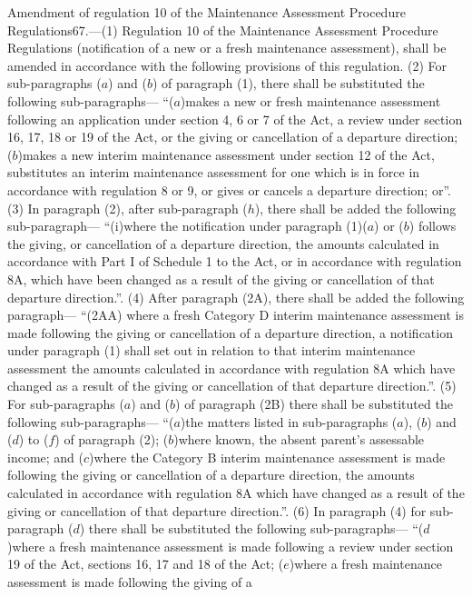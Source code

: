 \documentclass[a4paper]{article}
\begin{document}
Amendment of regulation 10 of the Maintenance Assessment Procedure
Regulations67.—(1) Regulation 10 of the Maintenance Assessment Procedure
Regulations (notification of a new or a fresh maintenance assessment), shall be
amended in accordance with the following provisions of this regulation.
(2) For sub-paragraphs ($a$) and ($b$) of paragraph (1), there shall be substituted
the following sub-paragraphs—
“($a$)makes a new or fresh maintenance assessment following an application under
section 4, 6 or 7 of the Act, a review under section 16, 17, 18 or 19 of the
Act, or the giving or cancellation of a departure direction;
($b$)makes a new interim maintenance assessment under section 12 of the Act,
substitutes an interim maintenance assessment for one which is in force in
accordance with regulation 8 or 9, or gives or cancels a departure direction;
or”.
(3) In paragraph (2), after sub-paragraph ($h$), there shall be added the
following sub-paragraph—
“(i)where the notification under paragraph (1)($a$) or ($b$) follows the giving, or
cancellation of a departure direction, the amounts calculated in accordance with
Part I of Schedule 1 to the Act, or in accordance with regulation 8A, which have
been changed as a result of the giving or cancellation of that departure
direction.”.
(4) After paragraph (2A), there shall be added the following paragraph—
“(2AA) where a fresh Category D interim maintenance assessment is made following
the giving or cancellation of a departure direction, a notification under
paragraph (1) shall set out in relation to that interim maintenance assessment
the amounts calculated in accordance with regulation 8A which have changed as a
result of the giving or cancellation of that departure direction.”.
(5) For sub-paragraphs ($a$) and ($b$) of paragraph (2B) there shall be substituted
the following sub-paragraphs—
“($a$)the matters listed in sub-paragraphs ($a$), ($b$) and ($d$) to ($f$) of paragraph
(2);
($b$)where known, the absent parent’s assessable income; and
($c$)where the Category B interim maintenance assessment is made following the
giving or cancellation of a departure direction, the amounts calculated in
accordance with regulation 8A which have changed as a result of the giving or
cancellation of that departure direction.”.
(6) In paragraph (4) for sub-paragraph ($d$) there shall be substituted the
following sub-paragraphs—
“($d$)where a fresh maintenance assessment is made following a review under
section 19 of the Act, sections 16, 17 and 18 of the Act;
($e$)where a fresh maintenance assessment is made following the giving of a
\end{document}
